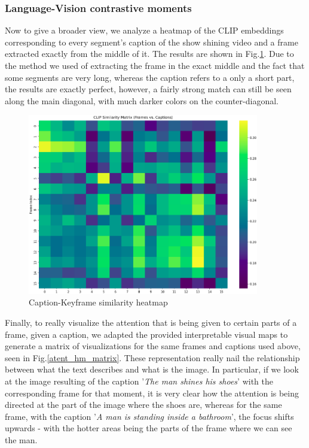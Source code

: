 \documentclass[runningheads]{llncs}
\begin{document}
\subsubsection{Language-Vision contrastive moments}
Now to give a broader view, we analyze a heatmap of the CLIP embeddings corresponding to every segment's caption of the show shining video and a frame extracted exactly from the middle of it. The results are shown in Fig.\ref{cap-frame-sim-heatmap}. Due to the method we used of extracting the frame in the exact middle and the fact that some segments are very long, whereas the caption refers to a only a short part, the results are exactly perfect, however, a fairly strong match can still be seen along the main diagonal, with much darker colors on the counter-diagonal.

\begin{figure}[!htb]
  \centering
  \includegraphics[width=0.9\textwidth, clip=true]{../figures/sim_heatmap.png}
  \caption{Caption-Keyframe similarity heatmap}\label{cap-frame-sim-heatmap}
\end{figure}

Finally, to really visualize the attention that is being given to certain parts of a frame, given a caption, we adapted the provided interpretable visual maps to generate a matrix of visualizations for the same frames and captions used above, seen in Fig.\ref{atent_hm_matrix}. These representation really nail the relationship between what the text describes and what is the image. In particular, if we look at the image resulting of the caption '\textit{The man shines his shoes}' with the corresponding frame for that moment, it is very clear how the attention is being directed at the part of the image where the shoes are, whereas for the same frame, with the caption '\textit{A man is standing inside a bathroom}', the focus shifts upwards - with the hotter areas being the parts of the frame where we can see the man.
\end{document}
